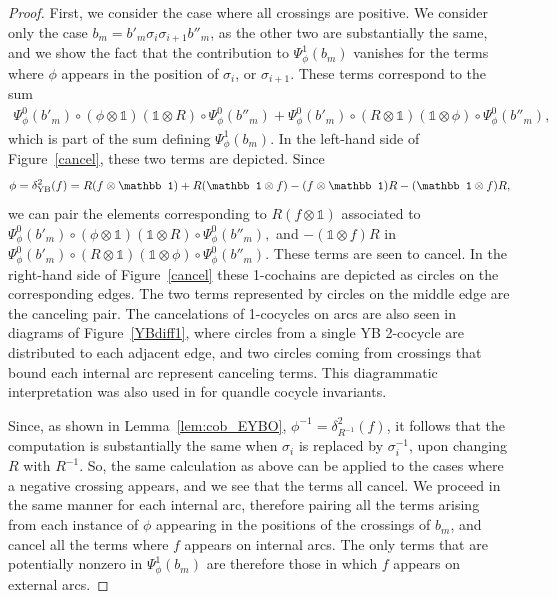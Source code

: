 \documentclass[11pt,fleqn]{amsart} %
\begin{document}
\begin{proof}
			 First, we consider the case where all crossings are positive.
			 We consider only the case $b_m = b'_m\sigma_i\sigma_{i+1}b''_m$, as the other two are substantially the same, and we show the fact that the contribution to $\Psi^1_\phi(b_m)$ vanishes for the terms where $\phi$ appears in the position of $\sigma_i$, or $\sigma_{i+1}$. 
 			These terms correspond to the sum 
 			\begin{eqnarray*}
 					\Psi_\phi^0(b'_m)\circ (\phi\otimes \mathbb 1)(\mathbb 1\otimes R)\circ  \Psi_\phi^0(b''_m) + \Psi_\phi^0(b'_m)\circ (R\otimes \mathbb 1)(\mathbb 1\otimes \phi)\circ  \Psi_\phi^0(b''_m),
 			\end{eqnarray*}
 			which is part of the sum defining $\Psi_\phi^1(b_m)$.
			In the left-hand side of Figure~\ref{cancel}, these two terms are depicted. 
				Since 
			$$\phi = \delta^2_{\rm YB}(f) = R(f\otimes \mathbb 1) + R(\mathbb 1\otimes f) - (f\otimes \mathbb 1)R - (\mathbb 1\otimes f)R, $$ 
			 we can pair the elements  corresponding to $R(f\otimes \mathbb 1)$ associated to 
			 $\Psi_\phi^0(b'_m)\circ (\phi\otimes \mathbb 1)(\mathbb 1\otimes R)\circ  \Psi_\phi^0(b''_m), $
			  and  $- (\mathbb 1\otimes f)R$ in 
			  $\Psi_\phi^0(b'_m)\circ (R\otimes \mathbb 1)(\mathbb 1\otimes \phi)\circ  \Psi_\phi^0(b''_m). $
			  These terms are seen to cancel. 
			  In the right-hand side of Figure~\ref{cancel} these 1-cochains are depicted as circles on the corresponding edges. The two terms represented by circles on the middle edge
			  are the canceling pair. 
			 The cancelations of 1-cocycles on arcs are also seen in diagrams of Figure~\ref{YBdiff1}, where circles from a single YB 2-cocycle are distributed to each adjacent edge, and two circles coming from crossings that bound each internal arc represent canceling terms.
             This diagrammatic interpretation was also used in \cite{CJKLS} for quandle cocycle invariants.
			
			 Since, as shown in Lemma~\ref{lem:cob_EYBO}, $\phi^{-1} = \delta^2_{R^{-1}}(f)$, it follows that the computation is substantially the same when $\sigma_i$ is replaced by $\sigma_i^{-1}$, upon changing $R$ with $R^{-1}$. So, the same calculation as above can be applied to the cases where a negative crossing appears, and we see that the terms all cancel.
			  We 
			  proceed in the same manner for each internal arc, therefore pairing all the terms arising from each instance of $\phi$ appearing in the positions of the crossings of $b_m$, and cancel all the terms where $f$ appears on internal arcs. The only terms that are potentially nonzero in $\Psi^1_\phi(b_m)$ are therefore those in which $f$ appears on external arcs.
	

\end{proof}
\end{document}

